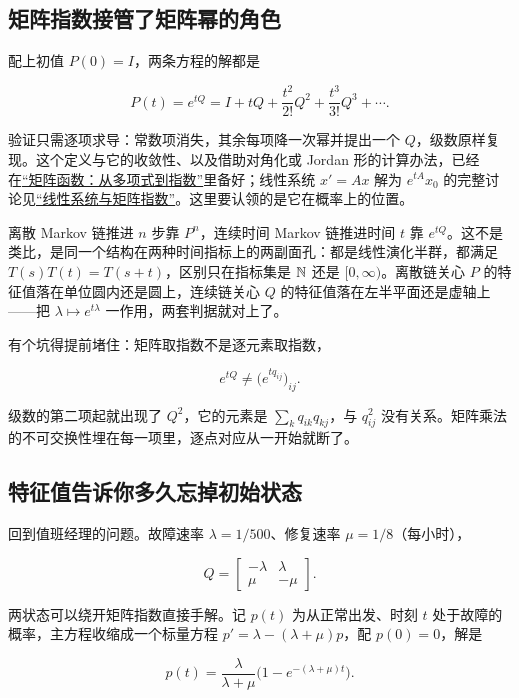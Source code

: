 \subsection{矩阵指数接管了矩阵幂的角色}

配上初值 \(P(0)=I\)，两条方程的解都是

\[
P(t)=e^{tQ}=I+tQ+\frac{t^2}{2!}Q^2+\frac{t^3}{3!}Q^3+\cdots.
\]

验证只需逐项求导：常数项消失，其余每项降一次幂并提出一个 \(Q\)，级数原样复现。这个定义与它的收敛性、以及借助对角化或 Jordan 形的计算办法，已经在\hyperref[sec:03-Linear-Algebra/05-Eigenvalues-and-Eigenvectors/04]{``矩阵函数：从多项式到指数''}里备好；线性系统 \(x'=Ax\) 解为 \(e^{tA}x_0\) 的完整讨论见\hyperref[sec:15-Differential-Equations-and-Dynamical-Systems/01-ODE-Theory/02]{``线性系统与矩阵指数''}。这里要认领的是它在概率上的位置。

离散 Markov 链推进 \(n\) 步靠 \(P^{n}\)，连续时间 Markov 链推进时间 \(t\) 靠 \(e^{tQ}\)。这不是类比，是同一个结构在两种时间指标上的两副面孔：都是线性演化半群，都满足 \(T(s)T(t)=T(s+t)\)，区别只在指标集是 \(\mathbb{N}\) 还是 \([0,\infty)\)。离散链关心 \(P\) 的特征值落在单位圆内还是圆上，连续链关心 \(Q\) 的特征值落在左半平面还是虚轴上——把 \(\lambda\mapsto e^{t\lambda}\) 一作用，两套判据就对上了。

有个坑得提前堵住：矩阵取指数不是逐元素取指数，

\[
e^{tQ}\ne\bigl(e^{tq_{ij}}\bigr)_{ij}.
\]

级数的第二项起就出现了 \(Q^2\)，它的元素是 \(\sum_k q_{ik}q_{kj}\)，与 \(q_{ij}^2\) 没有关系。矩阵乘法的不可交换性埋在每一项里，逐点对应从一开始就断了。

\subsection{特征值告诉你多久忘掉初始状态}

回到值班经理的问题。故障速率 \(\lambda=1/500\)、修复速率 \(\mu=1/8\)（每小时），

\[
Q=\begin{bmatrix}-\lambda&\lambda\\ \mu&-\mu\end{bmatrix}.
\]

两状态可以绕开矩阵指数直接手解。记 \(p(t)\) 为从正常出发、时刻 \(t\) 处于故障的概率，主方程收缩成一个标量方程 \(p'=\lambda-(\lambda+\mu)p\)，配 \(p(0)=0\)，解是

\[
p(t)=\frac{\lambda}{\lambda+\mu}\bigl(1-e^{-(\lambda+\mu)t}\bigr).
\]

